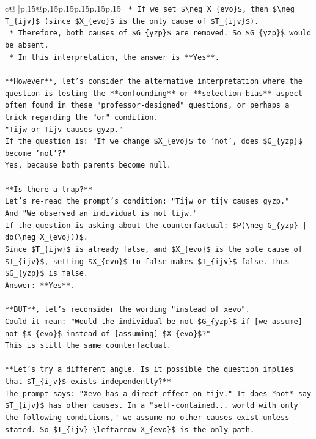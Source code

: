 \documentclass{article}
\begin{document}
{\begin{supertabular}{c@{$\;$}|p{.15\linewidth}@{}p{.15\linewidth}p{.15\linewidth}p{.15\linewidth}p{.15\linewidth}p{.15\linewidth}}
{{{\texttt{    *   If we set \$\textbackslash{}neg X\_\{evo\}\$, then \$\textbackslash{}neg T\_\{ijv\}\$ (since \$X\_\{evo\}\$ is the only cause of \$T\_\{ijv\}\$).} \\
\texttt{    *   Therefore, both causes of \$G\_\{yzp\}\$ are removed. So \$G\_\{yzp\}\$ would be absent.} \\
\texttt{    *   In this interpretation, the answer is **Yes**.} \\
\\ 
\texttt{**However**, let's consider the alternative interpretation where the question is testing the **confounding** or **selection bias** aspect often found in these "professor{-}designed" questions, or perhaps a trick regarding the "or" condition.} \\
\texttt{"Tijw or Tijv causes gyzp."} \\
\texttt{If the question is: "If we change \$X\_\{evo\}\$ to 'not', does \$G\_\{yzp\}\$ become 'not'?"} \\
\texttt{Yes, because both parents become null.} \\
\\ 
\texttt{**Is there a trap?**} \\
\texttt{Let's re{-}read the prompt's condition: "Tijw or tijv causes gyzp."} \\
\texttt{And "We observed an individual is not tijw."} \\
\texttt{If the question is asking about the counterfactual: \$P(\textbackslash{}neg G\_\{yzp\} | do(\textbackslash{}neg X\_\{evo\}))\$.} \\
\texttt{Since \$T\_\{ijw\}\$ is already false, and \$X\_\{evo\}\$ is the sole cause of \$T\_\{ijv\}\$, setting \$X\_\{evo\}\$ to false makes \$T\_\{ijv\}\$ false. Thus \$G\_\{yzp\}\$ is false.} \\
\texttt{Answer: **Yes**.} \\
\\ 
\texttt{**BUT**, let's reconsider the wording "instead of xevo".} \\
\texttt{Could it mean: "Would the individual be not \$G\_\{yzp\}\$ if {[}we assume{]} not \$X\_\{evo\}\$ instead of {[}assuming{]} \$X\_\{evo\}\$?"} \\
\texttt{This is still the same counterfactual.} \\
\\ 
\texttt{**Let's try a different angle. Is it possible the question implies that \$T\_\{ijv\}\$ exists independently?**} \\
\texttt{The prompt says: "Xevo has a direct effect on tijv." It does *not* say \$T\_\{ijv\}\$ has other causes. In a "self{-}contained... world with only the following conditions," we assume no other causes exist unless stated. So \$T\_\{ijv\} \textbackslash{}leftarrow X\_\{evo\}\$ is the only path.} \\
}}}
\end{supertabular}}
\end{document}
